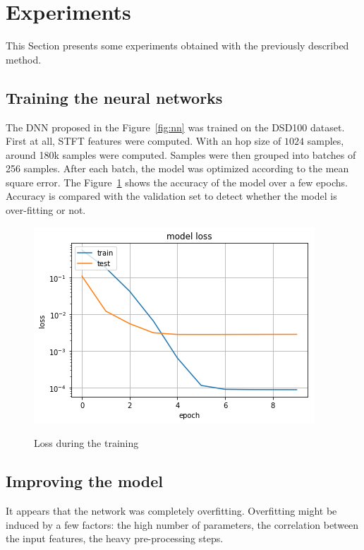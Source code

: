 \section{Experiments}
\label{sec:xp}

This Section presents some experiments obtained with the previously described method.

\subsection{Training the neural networks}

The DNN proposed in the Figure~\ref{fig:nn} was trained
on the DSD100 dataset.
First at all, STFT features were computed. With an hop size of $1024$ samples,
around 180k samples were computed. Samples were then grouped into batches of 256 samples.
After each batch, the model was optimized according to the mean square error.
The Figure~\ref{fig:train-basic} shows the accuracy of the model over a few epochs.
Accuracy is compared with the validation set to detect whether the model is
over-fitting or not.

\begin{figure}
  \centering
  \includegraphics[width=0.8\columnwidth]{train-basic.png}
  \label{fig:train-basic}
  \caption{Loss during the training}
\end{figure}

\subsection{Improving the model}

It appears that the network was completely overfitting. Overfitting might be induced
by a few factors: the high number of parameters, the correlation between the input
features, the heavy pre-processing steps.

